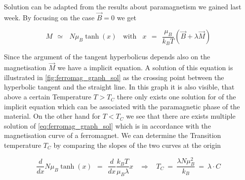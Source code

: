 \documentclass[10pt]{report}
\numberwithin{equation}{chapter}
\begin{document}
Solution can be adapted from the results about paramagnetism we gained last week. By focusing on the case $\vec{B} = 0$ we get

\begin{equation} \label{eq:ferromag_graph_sol}
  M ~~≃~~~ N \mu_B \tanh(x) ~~~~ \text{with} ~~~~ x ~~=~~\frac{\mu_B}{k_BT} (\vec{B} + \lambda \vec{M})
\end{equation}

Since the argument of the tangent hyperbolicus depends also on the magnetisation $\vec{M}$ we have a implicit equation. A solution of this equation is illustrated in \ref{fig:ferromag_graph_sol} as the crossing point between the hyperbolic tangent and the straight line. In this graph it is also visible, that above a certain Temperature $T>T_C$ there only exists one solution for of the implicit equation which can be associated with the paramagnetic phase of the material. On the other hand for $T<T_C$ we see that there are exists multiple solution of \ref{eq:ferromag_graph_sol} which is in accordance with the magnetisation curve of a ferromagnet. We can determine the Transition temperature $T_C$ by comparing the slopes of the two curves at the origin

\begin{equation}
  \frac{d}{dx} N \mu_B \tanh(x) ~~ = ~~ \frac{d}{dx} \frac{k_BT}{\mu_B \lambda} x ~~~~ \Rightarrow ~~~~
  T_C ~=~\frac{\lambda N \mu_B^2}{k_B} ~=~ \lambda \cdot C
\end{equation}
\end{document}
